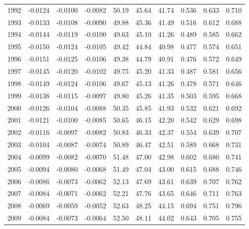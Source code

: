\begin{tabular}{cccccccccc}
  1992 & -0.0124 & -0.0100 & -0.0082 & 50.19 & 45.64 & 41.74 & 0.536 & 0.633 & 0.710 \\ 
  1993 & -0.0133 & -0.0108 & -0.0090 & 49.88 & 45.36 & 41.49 & 0.516 & 0.612 & 0.688 \\ 
  1994 & -0.0144 & -0.0119 & -0.0100 & 49.63 & 45.10 & 41.26 & 0.489 & 0.585 & 0.662 \\ 
  1995 & -0.0150 & -0.0124 & -0.0105 & 49.42 & 44.84 & 40.98 & 0.477 & 0.574 & 0.651 \\ 
  1996 & -0.0151 & -0.0125 & -0.0106 & 49.38 & 44.79 & 40.91 & 0.476 & 0.572 & 0.649 \\ 
  1997 & -0.0145 & -0.0120 & -0.0102 & 49.75 & 45.20 & 41.33 & 0.487 & 0.581 & 0.656 \\ 
  1998 & -0.0149 & -0.0124 & -0.0106 & 49.67 & 45.13 & 41.26 & 0.478 & 0.571 & 0.646 \\ 
  1999 & -0.0138 & -0.0115 & -0.0097 & 49.80 & 45.26 & 41.35 & 0.503 & 0.595 & 0.668 \\ 
  2000 & -0.0126 & -0.0104 & -0.0088 & 50.35 & 45.85 & 41.93 & 0.532 & 0.621 & 0.692 \\ 
  2001 & -0.0121 & -0.0100 & -0.0085 & 50.65 & 46.15 & 42.20 & 0.542 & 0.629 & 0.698 \\ 
  2002 & -0.0116 & -0.0097 & -0.0082 & 50.83 & 46.33 & 42.37 & 0.554 & 0.639 & 0.707 \\ 
  2003 & -0.0104 & -0.0087 & -0.0074 & 50.89 & 46.47 & 42.51 & 0.589 & 0.668 & 0.731 \\ 
  2004 & -0.0099 & -0.0082 & -0.0070 & 51.48 & 47.00 & 42.98 & 0.602 & 0.680 & 0.741 \\ 
  2005 & -0.0094 & -0.0080 & -0.0068 & 51.49 & 47.04 & 43.00 & 0.615 & 0.688 & 0.746 \\ 
  2006 & -0.0086 & -0.0073 & -0.0062 & 52.13 & 47.69 & 43.61 & 0.639 & 0.707 & 0.762 \\ 
  2007 & -0.0084 & -0.0071 & -0.0062 & 52.21 & 47.76 & 43.65 & 0.646 & 0.711 & 0.763 \\ 
  2008 & -0.0069 & -0.0059 & -0.0052 & 52.63 & 48.25 & 44.15 & 0.694 & 0.751 & 0.796 \\ 
  2009 & -0.0084 & -0.0073 & -0.0064 & 52.50 & 48.11 & 44.02 & 0.643 & 0.705 & 0.755 \\ 
   \hline
\end{tabular}
